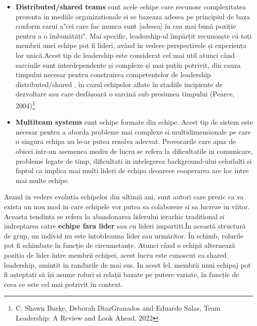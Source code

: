 \documentclass[a4paper, 12pt]{article}
\begin{document}
\begin{itemize}
	\item \textbf {Distributed/shared teams} sunt acele echipe care recunosc complexitatea prezenta in mediile organizationale si se bazeaza adesea pe principiul de baza conform carui a"cei care fac munca sunt [adesea] în cea mai bună poziție pentru a o îmbunătăți". Mai specific, leadership-ul împărțit recunoaște că toți membrii unei echipe pot fi lideri, având în vedere perspectivele și experiența lor unică.Acest tip de leadership este considerat cel mai util atunci când sarcinile sunt interdependente și complexe și mai puțin potrivit, din cauza timpului necesar pentru construirea competențelor de leadership distributed/shared , în cazul echipelor aflate în stadiile incipiente de dezvoltare sau care desfășoară o sarcină sub presiunea timpului (Pearce, 2004)\footnote{C. Shawn Burke, Deborah DiazGranados and Eduardo Salas, Team Leadership: A Review and Look Ahead, 2022}


	\item \textbf{Multiteam systems} sunt echipe formate din echipe. Acest tip de sistem este necesar pentru a aborda probleme mai complexe si multidimensionale pe care o singura echipa nu le-ar putea rezolva adecvat. Provocarile care apar de obicei intr-un asemenea mediu de lucru  se refera la dificultatile in comunicare, probleme legate de timp, dificultati in intelegerea background-ului celorlalti si faptul ca implica mai multi lideri de echipa deoarece cooperarea are loc intre mai multe echipe.
	
\end{itemize}

	\quad\quad Avand in vedere evolutia echipelor din ultimii ani, sunt autori care prezic ca va exista un nou mod in care echipele vor putea sa colaboreze si sa lucreze in viitor. Aceasta tendinta se refera la abandonarea liderului ierarhic traditional si indreptarea catre \textbf{echipe fara lider} sau cu lideri impartiti.În această structură de grup, un individ nu este întotdeauna lider sau urmăritor. În schimb, rolurile pot fi schimbate în funcție de circumstanțe. Atunci când o echipă alternează poziția de lider între membrii echipei, acest lucru este cunoscut ca shared leadership, amintit in randurile de mai sus. In acest fel, membrii unui echipaj pot fi așteptați să își asume roluri și relații bazate pe putere variate, în funcție de ceea ce este cel mai potrivit în context.
\end{document}
